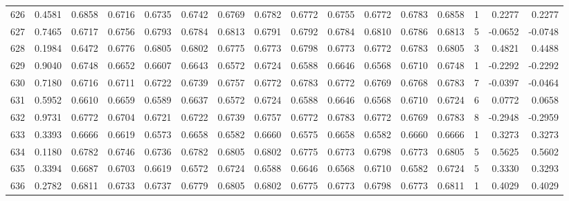 \begin{tabular}{lrrrrrrrrrrrrrrr}
626 &      0.4581 &  0.6858 &  0.6716 &  0.6735 &  0.6742 &  0.6769 &  0.6782 &  0.6772 &  0.6755 &  0.6772 &   0.6783 &     0.6858 &      1 &                    0.2277 &                     0.2277 \\
627 &      0.7465 &  0.6717 &  0.6756 &  0.6793 &  0.6784 &  0.6813 &  0.6791 &  0.6792 &  0.6784 &  0.6810 &   0.6786 &     0.6813 &      5 &                   -0.0652 &                    -0.0748 \\
628 &      0.1984 &  0.6472 &  0.6776 &  0.6805 &  0.6802 &  0.6775 &  0.6773 &  0.6798 &  0.6773 &  0.6772 &   0.6783 &     0.6805 &      3 &                    0.4821 &                     0.4488 \\
629 &      0.9040 &  0.6748 &  0.6652 &  0.6607 &  0.6643 &  0.6572 &  0.6724 &  0.6588 &  0.6646 &  0.6568 &   0.6710 &     0.6748 &      1 &                   -0.2292 &                    -0.2292 \\
630 &      0.7180 &  0.6716 &  0.6711 &  0.6722 &  0.6739 &  0.6757 &  0.6772 &  0.6783 &  0.6772 &  0.6769 &   0.6768 &     0.6783 &      7 &                   -0.0397 &                    -0.0464 \\
631 &      0.5952 &  0.6610 &  0.6659 &  0.6589 &  0.6637 &  0.6572 &  0.6724 &  0.6588 &  0.6646 &  0.6568 &   0.6710 &     0.6724 &      6 &                    0.0772 &                     0.0658 \\
632 &      0.9731 &  0.6772 &  0.6704 &  0.6721 &  0.6722 &  0.6739 &  0.6757 &  0.6772 &  0.6783 &  0.6772 &   0.6769 &     0.6783 &      8 &                   -0.2948 &                    -0.2959 \\
633 &      0.3393 &  0.6666 &  0.6619 &  0.6573 &  0.6658 &  0.6582 &  0.6660 &  0.6575 &  0.6658 &  0.6582 &   0.6660 &     0.6666 &      1 &                    0.3273 &                     0.3273 \\
634 &      0.1180 &  0.6782 &  0.6746 &  0.6736 &  0.6782 &  0.6805 &  0.6802 &  0.6775 &  0.6773 &  0.6798 &   0.6773 &     0.6805 &      5 &                    0.5625 &                     0.5602 \\
635 &      0.3394 &  0.6687 &  0.6703 &  0.6619 &  0.6572 &  0.6724 &  0.6588 &  0.6646 &  0.6568 &  0.6710 &   0.6582 &     0.6724 &      5 &                    0.3330 &                     0.3293 \\
636 &      0.2782 &  0.6811 &  0.6733 &  0.6737 &  0.6779 &  0.6805 &  0.6802 &  0.6775 &  0.6773 &  0.6798 &   0.6773 &     0.6811 &      1 &                    0.4029 &                     0.4029 \\

\end{tabular}
